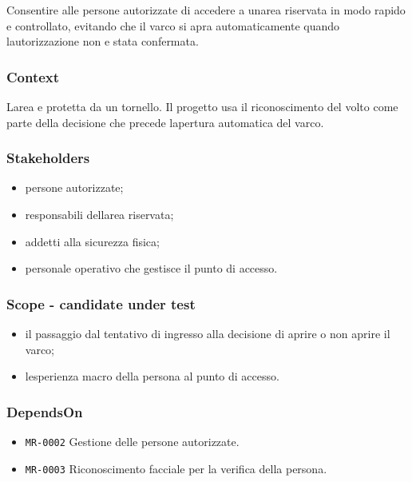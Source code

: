 \documentclass[
  10pt,
]{article}
\providecommand{\tightlist}{%
  \setlength{\itemsep}{0pt}\setlength{\parskip}{0pt}}
\begin{document}
Consentire alle persone autorizzate di accedere a
un\textquotesingle area riservata in modo rapido e controllato, evitando
che il varco si apra automaticamente quando
l\textquotesingle autorizzazione non e stata confermata.

\subsubsection{Context}\label{context}

L\textquotesingle area e protetta da un tornello. Il progetto usa il
riconoscimento del volto come parte della decisione che precede
l\textquotesingle apertura automatica del varco.

\subsubsection{Stakeholders}\label{stakeholders}

\begin{itemize}
\tightlist
\item
  persone autorizzate;
\item
  responsabili dell\textquotesingle area riservata;
\item
  addetti alla sicurezza fisica;
\item
  personale operativo che gestisce il punto di accesso.
\end{itemize}

\subsubsection{Scope - candidate under
test}\label{scope---candidate-under-test}

\begin{itemize}
\tightlist
\item
  il passaggio dal tentativo di ingresso alla decisione di aprire o non
  aprire il varco;
\item
  l\textquotesingle esperienza macro della persona al punto di accesso.
\end{itemize}

\subsubsection{DependsOn}\label{dependson}

\begin{itemize}
\tightlist
\item
  \texttt{MR-0002} Gestione delle persone autorizzate.
\item
  \texttt{MR-0003} Riconoscimento facciale per la verifica della
  persona.
\end{itemize}
\end{document}

